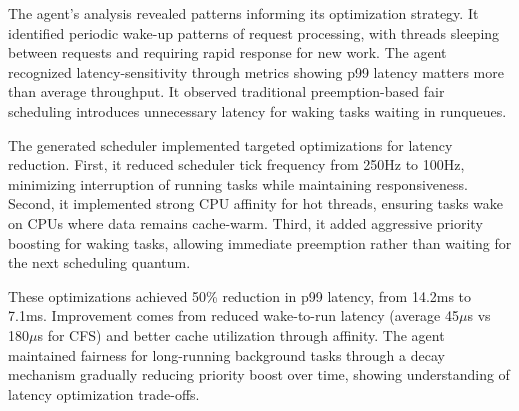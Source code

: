 The agent's analysis revealed patterns informing its optimization strategy. It identified periodic wake-up patterns of request processing, with threads sleeping between requests and requiring rapid response for new work. The agent recognized latency-sensitivity through metrics showing p99 latency matters more than average throughput. It observed traditional preemption-based fair scheduling introduces unnecessary latency for waking tasks waiting in runqueues.

The generated scheduler implemented targeted optimizations for latency reduction. First, it reduced scheduler tick frequency from 250Hz to 100Hz, minimizing interruption of running tasks while maintaining responsiveness. Second, it implemented strong CPU affinity for hot threads, ensuring tasks wake on CPUs where data remains cache-warm. Third, it added aggressive priority boosting for waking tasks, allowing immediate preemption rather than waiting for the next scheduling quantum.

These optimizations achieved 50\% reduction in p99 latency, from 14.2ms to 7.1ms. Improvement comes from reduced wake-to-run latency (average 45$\mu$s vs 180$\mu$s for CFS) and better cache utilization through affinity. The agent maintained fairness for long-running background tasks through a decay mechanism gradually reducing priority boost over time, showing understanding of latency optimization trade-offs.

